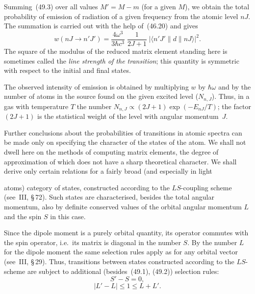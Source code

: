 Summing~(49.3) over all values $M' = M - m$ (for a given $M$), we obtain the total probability of emission of radiation of a given frequency from the atomic level $nJ$. The summation is carried out with the help of~(46.20) and gives
\begin{equation}
w(nJ \to n'J') = \frac{4\omega^3}{3\hbar c^3}\;\frac{1}{2J+1}\;|\langle n'J'\|d\|nJ\rangle|^2.
\tag{49.4}
\end{equation}
The square of the modulus of the reduced matrix element standing here is sometimes called the \textit{line strength of the transition}; this quantity is symmetric with respect to the initial and final states.

The observed intensity of emission is obtained by multiplying $w$ by $\hbar\omega$ and by the number of atoms in the source found on the given excited level ($N_{n,J}$). Thus, in a gas with temperature $T$ the number $N_{n,J} \propto (2J+1)\exp(-E_{nJ}/T)$; the factor $(2J+1)$ is the statistical weight of the level with angular momentum~$J$.

Further conclusions about the probabilities of transitions in atomic spectra can be made only on specifying the character of the states of the atom. We shall not dwell here on the methods of computing matrix elements, the degree of approximation of which does not have a sharp theoretical character. We shall derive only certain relations for a fairly broad (and especially in light

atoms) category of states, constructed according to the $LS$-coupling scheme (see~III, \S\,72). Such states are characterised, besides the total angular momentum, also by definite conserved values of the orbital angular momentum $L$ and the spin $S$ in this case.

Since the dipole moment is a purely orbital quantity, its operator commutes with the spin operator, i.e.\ its matrix is diagonal in the number $S$. By the number $L$ for the dipole moment the same selection rules apply as for any orbital vector (see~III, \S\,29). Thus, transitions between states constructed according to the $LS$-scheme are subject to additional (besides~(49.1), (49.2)) selection rules:
\begin{equation}
S' - S = 0,
\tag{49.5}
\end{equation}
\begin{equation}
|L' - L| \leqslant 1 \leqslant L + L'.
\tag{49.6}
\end{equation}

